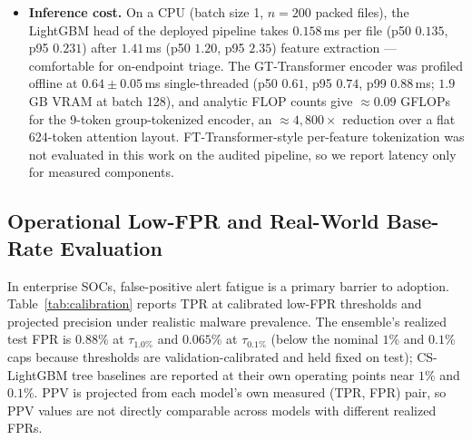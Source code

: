 \documentclass[Number]{sn-jnl}
\begin{document}
\begin{itemize}[leftmargin=*]
\item \textbf{Inference cost.}
On a CPU (batch size 1, $n=200$ packed files), the LightGBM head of the deployed pipeline takes $0.158$\,ms per file (p50 $0.135$, p95 $0.231$) after $1.41$\,ms (p50 $1.20$, p95 $2.35$) feature extraction --- comfortable for on-endpoint triage. The GT-Transformer encoder was profiled offline at $0.64\pm0.05$\,ms single-threaded (p50 $0.61$, p95 $0.74$, p99 $0.88$\,ms; $1.9$\,GB VRAM at batch 128), and analytic FLOP counts give $\approx0.09$ GFLOPs for the 9-token group-tokenized encoder, an $\approx4{,}800\times$ reduction over a flat 624-token attention layout. FT-Transformer-style per-feature tokenization was not evaluated in this work on the audited pipeline, so we report latency only for measured components.
\end{itemize}

\subsection{Operational Low-FPR and Real-World Base-Rate Evaluation}\label{subsec:calibration}

In enterprise SOCs, false-positive alert fatigue is a primary barrier to adoption. Table~\ref{tab:calibration} reports TPR at calibrated low-FPR thresholds and projected precision under realistic malware prevalence. The ensemble's realized test FPR is $0.88\%$ at $\tau_{1.0\%}$ and $0.065\%$ at $\tau_{0.1\%}$ (below the nominal $1\%$ and $0.1\%$ caps because thresholds are validation-calibrated and held fixed on test); CS-LightGBM tree baselines are reported at their own operating points near $1\%$ and $0.1\%$. PPV is projected from each model's own measured (TPR, FPR) pair, so PPV values are not directly comparable across models with different realized FPRs.
\end{document}
